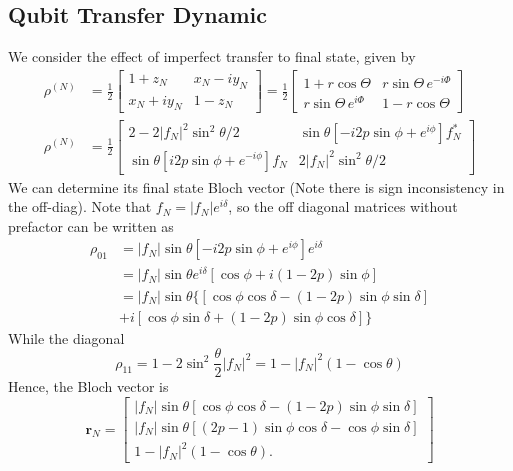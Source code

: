 \documentclass[../../../main.tex]{subfiles}
\begin{document}
\subsection{Qubit Transfer Dynamic}
We consider the effect of imperfect transfer to final state, given by
\begin{align*}
  \rho^{(N)}
   & =
  \frac12
  \begin{bmatrix}
    1+z_N    & x_N-iy_N \\
    x_N+iy_N & 1-z_N
  \end{bmatrix} =
  \frac{1 }{2 }
  \begin{bmatrix}
    1+r\cos\Theta
     &
    r\sin\Theta\,e^{-i\Phi} \\
    r\sin\Theta\,e^{i\Phi}
     &
    1-r\cos\Theta
  \end{bmatrix} \\
  \rho^{(N)}
   & = \frac{1 }{2}
  \begin{bmatrix}
    2- 2|f_N|^2\sin^2 \theta/2                                 & \sin \theta \left[-i2p \sin \phi + e^{i\phi}  \right]f_N ^*\\
    \sin \theta \left[i2p \sin\phi + e^{-i\phi}  \right]f_N & 2|f_N|^2 \sin ^2 \theta/2
  \end{bmatrix}
\end{align*}
We can determine its final state Bloch vector (Note there is sign inconsistency in the off-diag).
Note that $f_N = |f_N|e^{i\delta}$, so the off diagonal matrices without prefactor can be written as
\begin{align*}
  \rho_{01}
   & =
  |f_N|\sin\theta\left[-i2p\sin\phi+e^{i\phi}\right]e^{i\delta}    \\
   & =
  |f_N|\sin\theta e^{i\delta}\left[\cos\phi+i(1-2p)\sin\phi\right] \\
   & =
  |f_N|\sin\theta
  \big\{\left[\cos\phi\cos\delta-(1-2p)\sin\phi\sin\delta\right]   \\
   &
  +i\left[\cos\phi\sin\delta+(1-2p)\sin\phi\cos\delta
    \right]\big\}
\end{align*}
While the diagonal
\begin{equation*}
  \rho_{11} =
  1-2\sin ^2 \frac{\theta  }{2}|f_N|^2 =
  1-|f_N|^2(1-\cos \theta)
\end{equation*}
Hence, the Bloch vector is
\begin{equation*}
  \mathbf{r}_N
  =
  \begin{bmatrix}
    |f_N|\sin\theta
    \left[
      \cos\phi\cos\delta
      -(1-2p)\sin\phi\sin\delta
    \right] \\
    |f_N|\sin\theta
    \left[
      (2p-1)\sin\phi\cos\delta
      -\cos\phi\sin\delta
    \right] \\
    1-|f_N|^2(1-\cos\theta).
  \end{bmatrix}
\end{equation*}
\end{document}
